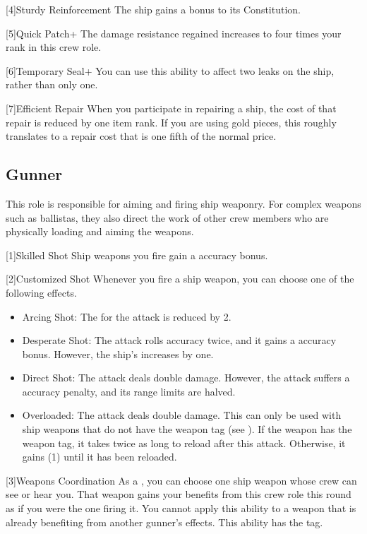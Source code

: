     [4]{Sturdy Reinforcement} The ship gains a  bonus to its Constitution.

    [5]{Quick Patch+} The damage resistance regained increases to four times your rank in this crew role.

    [6]{Temporary Seal+} You can use this ability to affect two leaks on the ship, rather than only one.

    [7]{Efficient Repair} When you participate in repairing a ship, the cost of that repair is reduced by one item rank.
      If you are using gold pieces, this roughly translates to a repair cost that is one fifth of the normal price.

  \subsection{Gunner}
    This role is responsible for aiming and firing ship weaponry.
    For complex weapons such as ballistas, they also direct the work of other crew members who are physically loading and aiming the weapons.

    [1]{Skilled Shot} Ship weapons you fire gain a  accuracy bonus.

    [2]{Customized Shot} Whenever you fire a ship weapon, you can choose one of the following effects.
      \begin{itemize}
        \item Arcing Shot: The  for the attack is reduced by 2.
        \item Desperate Shot: The attack rolls accuracy twice, and it gains a  accuracy bonus.
          However, the ship's  increases by one.
        \item Direct Shot: The attack deals double damage.
          However, the attack suffers a  accuracy penalty, and its range limits are halved.
        \item Overloaded: The attack deals double damage.
          This can only be used with ship weapons that do not have the  weapon tag (see ).
          If the weapon has the  weapon tag, it takes twice as long to reload after this attack.
          Otherwise, it gains  (1) until it has been reloaded.
      \end{itemize}

    [3]{Weapons Coordination} As a , you can choose one ship weapon whose crew can see or hear you.
      That weapon gains your benefits from this crew role this round as if you were the one firing it.
      You cannot apply this ability to a weapon that is already benefiting from another gunner's effects.
      This ability has the  tag.

